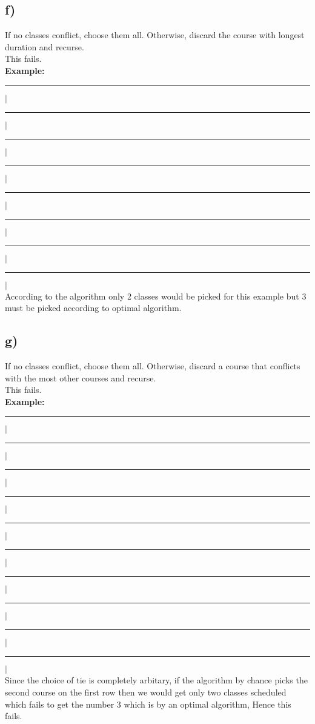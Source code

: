 \documentclass{report}
\begin{document}
 \subsection*{f)}
 If no classes conflict, choose them all. Otherwise, discard the course with longest duration and recurse.\\
 This fails.\\
 \textbf{Example:}\\
 \noindent\rule[0.5mm]{0.15cm}{0pt}$|$\noindent\rule[0.5mm]{1.60cm}{0.4pt}$|$\noindent\rule[0.5mm]{0.25cm}{0pt}$|$\noindent\rule[0.5mm]{2cm}{0.4pt}$|$\\
 \noindent\rule[0.5mm]{1.25cm}{0pt}$|$\noindent\rule[0.5mm]{2.6cm}{0.4pt}$|$\noindent\rule[0.5mm]{1.5cm}{0pt}$|$\noindent\rule[0.5mm]{4.5cm}{0.4pt}$|$\\
 According to the algorithm only 2 classes would be picked for this example but 3 must be picked according to optimal algorithm.
 \subsection*{g)}
 If no classes conflict, choose them all. Otherwise, discard a course that conflicts with the most other courses and recurse.\\
 This fails.\\
 \textbf{Example:}\\
 \noindent\rule[0.5mm]{0.15cm}{0pt}$|$\noindent\rule[0.5mm]{1.60cm}{0.4pt}$|$\noindent\rule[0.5mm]{0.25cm}{0pt}$|$\noindent\rule[0.5mm]{2cm}{0.4pt}$|$\noindent\rule[0.5mm]{1cm}{0pt}$|$\noindent\rule[0.5mm]{2cm}{0.4pt}$|$\\
  \noindent\rule[0.5mm]{1.25cm}{0pt}$|$\noindent\rule[0.5mm]{1.1cm}{0.4pt}$|$\noindent\rule[0.5mm]{1cm}{0pt}$|$\noindent\rule[0.5mm]{3.5cm}{0.4pt}$|$\\
 Since the choice of tie is completely arbitary, if the algorithm by chance picks the second course on the first row then we would get only two classes scheduled which fails to get the number 3 which is by an optimal algorithm, Hence this fails.
\end{document}
